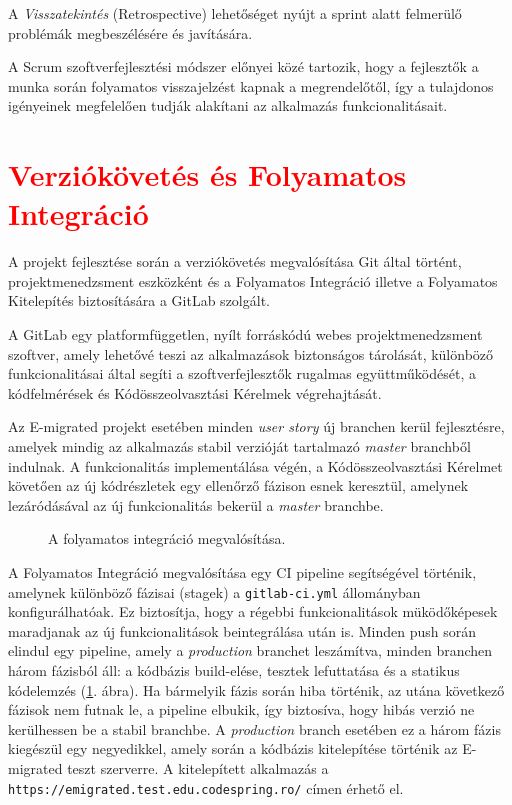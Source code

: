 A \textsl{Visszatekintés} (Retrospective) lehetőséget nyújt a sprint alatt felmerülő problémák megbeszélésére és javítására.

A Scrum szoftverfejlesztési módszer előnyei közé tartozik, hogy a fejlesztők a munka során folyamatos visszajelzést kapnak a megrendelőtől, így a tulajdonos igényeinek megfelelően tudják alakítani az alkalmazás funkcionalitásait.

\section{\textcolor{red}{Verziókövetés és Folyamatos Integráció}}
A projekt fejlesztése során a verziókövetés megvalósítása Git által történt, projektmenedzsment eszközként és a Folyamatos Integráció  \cite{CI} illetve a Folyamatos Kitelepítés \cite{CD}  biztosítására a GitLab szolgált. 

A GitLab egy platformfüggetlen, nyílt forráskódú webes projektmenedzsment szoftver, amely lehetővé teszi az alkalmazások biztonságos tárolását, különböző funkcionalitásai által segíti a szoftverfejlesztők rugalmas együttműködését, a kódfelmérések és Kódösszeolvasztási Kérelmek  végrehajtását. 

Az E-migrated projekt esetében minden \textsl{user story} új branchen kerül fejlesztésre, amelyek mindig az alkalmazás stabil verzióját tartalmazó \textsl{master} branchből indulnak. A funkcionalitás implementálása végén, a Kódösszeolvasztási Kérelmet követően az új kódrészletek egy ellenőrző fázison esnek keresztül, amelynek lezáródásával az új funkcionalitás bekerül a \textsl{master} branchbe. 
\begin{figure}[!b]
  \centering
  \caption{A folyamatos integráció megvalósítása. }
  \label{fig:continuous_integration}
\end{figure}

A Folyamatos Integráció megvalósítása egy CI pipeline segítségével történik, amelynek különböző fázisai (stagek) a \texttt{gitlab-ci.yml} állományban  konfigurálhatóak. Ez biztosítja, hogy a régebbi funkcionalitások müködőképesek maradjanak az új funkcionalitások beintegrálása után is. Minden push során elindul egy pipeline, amely a \textsl{production} branchet leszámítva, minden branchen három fázisból áll: a kódbázis build-elése, tesztek lefuttatása és a statikus kódelemzés (\ref{fig:continuous_integration}. ábra). Ha bármelyik fázis során hiba történik, az utána következő fázisok nem futnak le, a pipeline elbukik, így biztosíva, hogy hibás verzió ne kerülhessen be a stabil branchbe. A \textsl{production} branch esetében ez a három fázis kiegészül egy negyedikkel, amely során a kódbázis kitelepítése történik az E-migrated teszt szerverre. A kitelepített alkalmazás a \texttt{https://emigrated.test.edu.codespring.ro/} címen érhető el. 




